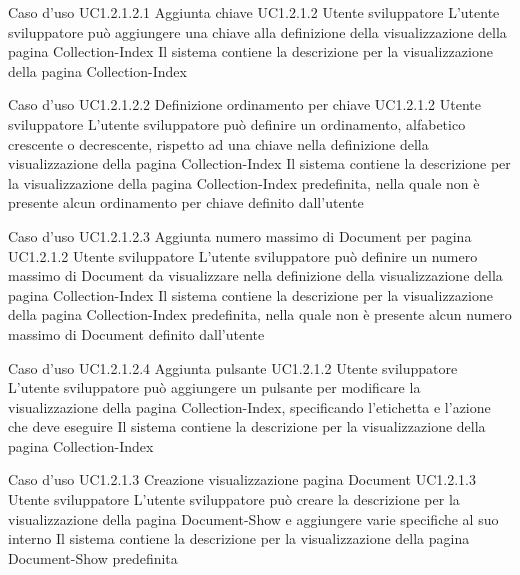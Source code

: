 \UCtitle
{Caso d'uso UC1.2.1.2.1}
{Aggiunta chiave}
\UC
{UC1.2.1.2}
{Utente sviluppatore}
{L'utente sviluppatore  può aggiungere una chiave alla definizione della visualizzazione della pagina Collection-Index}
{Il sistema contiene la descrizione per la visualizzazione della pagina Collection-Index}


\UCtitle
{Caso d'uso UC1.2.1.2.2}
{Definizione ordinamento per chiave}
\UC
{UC1.2.1.2}
{Utente sviluppatore}
{L'utente sviluppatore  può  definire un ordinamento, alfabetico crescente o decrescente, rispetto ad una chiave nella definizione della visualizzazione della pagina Collection-Index}
{Il sistema contiene la descrizione per la visualizzazione della pagina Collection-Index predefinita, nella quale non è presente alcun ordinamento per chiave definito dall'utente}

\UCtitle
{Caso d'uso UC1.2.1.2.3}
{Aggiunta numero massimo di Document per pagina}
\UC
{UC1.2.1.2}
{Utente sviluppatore}
{L'utente sviluppatore  può definire un numero massimo di Document da visualizzare nella definizione della visualizzazione della pagina Collection-Index}
{Il sistema contiene la descrizione per la visualizzazione della pagina Collection-Index predefinita, nella quale non è presente alcun numero massimo di Document definito dall'utente}

\UCtitle
{Caso d'uso UC1.2.1.2.4}
{Aggiunta pulsante}
\UC
{UC1.2.1.2}
{Utente sviluppatore}
{L'utente sviluppatore può aggiungere un pulsante per modificare la visualizzazione della pagina Collection-Index, specificando l'etichetta e l'azione che deve eseguire}
{Il sistema contiene la descrizione per la visualizzazione della pagina Collection-Index}


\UCtitle
{Caso d'uso UC1.2.1.3}
{Creazione visualizzazione pagina Document}
\UC
{UC1.2.1.3}
{Utente sviluppatore}
{L'utente sviluppatore  può creare la descrizione per la visualizzazione della pagina Document-Show e aggiungere varie specifiche al suo interno}
{Il sistema contiene la descrizione per la visualizzazione della pagina Document-Show predefinita}

